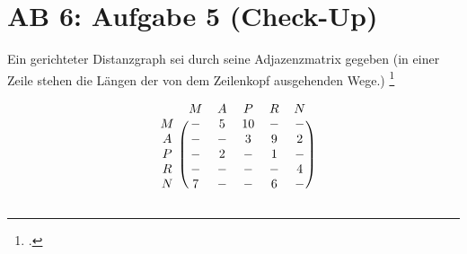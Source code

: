 \documentclass{lehramt-informatik-haupt}
\begin{document}
%

\section{AB 6: Aufgabe 5 (Check-Up)}

Ein gerichteter Distanzgraph sei durch seine Adjazenzmatrix gegeben (in
einer Zeile stehen die Längen der von dem Zeilenkopf ausgehenden Wege.)
\footcite[Seite 3]{aud:ab:6}

\[
\begin{blockarray}{cccccc}
& M & A & P & R & N \\
\begin{block}{c(ccccc)}
  M & - & 5 & 10& - & - \\
  A & - & - & 3 & 9 & 2 \\
  P & - & 2 & - & 1 & - \\
  R & - & - & - & - & 4 \\
  N & 7 & - & - & 6 & - \\
\end{block}
\end{blockarray}
\]
\end{document}
